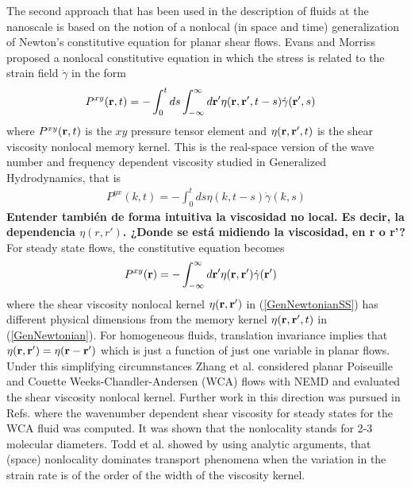 \documentclass[a4paper,openright,12pt]{book}
\newcommand{\Note}[1]{{\bf \color{red}#1}}    %
\begin{document}
The second approach that has been used in the description of fluids at
the nanoscale  is based  on the  notion of a  nonlocal (in  space and
time)  generalization of  Newton's  constitutive  equation for  planar
shear  flows. Evans and Morriss \cite{EvansMorris2008} proposed a nonlocal constitutive equation in  which  the  stress is  related  to  the strain  field $\dot{\gamma}$ in the form
\begin{align}
  P^{xy}({\bf r},t)&=-\int_0^t ds \int_{-\infty}^{\infty} d{\bf r}'
\eta({\bf r},{\bf r}',t-s)\dot{\gamma}({\bf r}',s)
\label{GenNewtonian}   %
\end{align}
where  $P^{xy}({\bf r}, t)$ is the $xy$ pressure tensor element and $\eta({\bf r},{\bf  r}',t)$  is the  shear viscosity  nonlocal
memory kernel.  This is the real-space  version of the wave number and
frequency     dependent    viscosity \cite{EvansMorriss2008}     studied    in     Generalized
Hydrodynamics, that is 
\begin{align}
  P^{yx}(k,t) = -\int_0^t ds\eta(k,t-s)\dot{\gamma}(k,s)
\end{align}
\Note{Entender también de forma intuitiva la viscosidad no local. Es decir, la dependencia $\eta(r,r')$. ¿Donde se está midiendo la viscosidad, en r o r'?}
For  steady  state flows,  the  constitutive  equation
becomes
\begin{align}
  P^{xy}({\bf r})&=-\int_{-\infty}^{\infty} d{\bf r}'
\eta({\bf r},{\bf r}')\dot{\gamma}({\bf r}')
\label{GenNewtonianSS}
\end{align}
where the shear viscosity nonlocal kernel $\eta({\bf r},{\bf r}')$ in
(\ref{GenNewtonianSS})  has  different  physical dimensions  from  the
memory kernel $\eta({\bf r},{\bf r}',t)$ in (\ref{GenNewtonian}).  For
homogeneous  fluids, translation  invariance  implies that  $\eta({\bf
  r},{\bf r}')=\eta({\bf  r}-{\bf r}')$  which is  just a  function of
just   one  variable   in  planar   flows.   Under   this  simplifying
circumnstances  Zhang  et   al.   \cite{Zhang2004}  considered  planar
Poiseuille  and  Couette  Weeks-Chandler-Andersen (WCA) flows  with NEMD  and  evaluated  the  shear
viscosity  nonlocal kernel.  Further  work in
this        direction        was        pursued        in        Refs.
\cite{Hansen2007,Todd2008a,Cadusch2008}    where    the    wavenumber
dependent  shear viscosity  for steady  states for  the WCA fluid was
computed. It was shown that  the nonlocality stands for 2-3 molecular
diameters.   Todd et  al.   \cite{Todd2008} showed  by using  analytic
arguments, that (space) nonlocality dominates transport phenomena when
the variation in the  strain rate is of the order of  the width of the
viscosity kernel.
\end{document}
